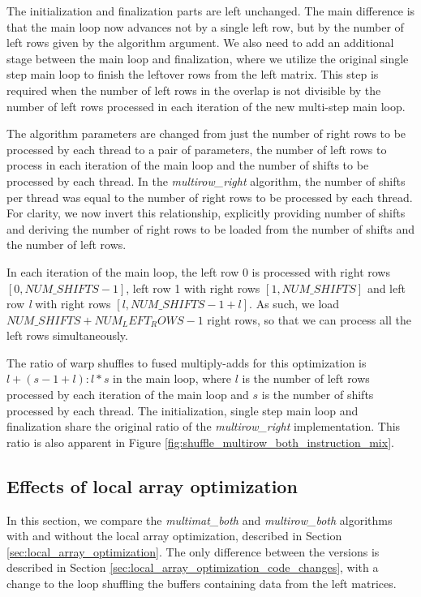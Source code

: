 The initialization and finalization parts are left unchanged. The main difference is that the main loop now advances not by a single left row, but by the number of left rows given by the algorithm argument. We also need to add an additional stage between the main loop and finalization, where we utilize the original single step main loop to finish the leftover rows from the left matrix. This step is required when the number of left rows in the overlap is not divisible by the number of left rows processed in each iteration of the new multi-step main loop.

The algorithm parameters are changed from just the number of right rows to be processed by each thread to a pair of parameters, the number of left rows to process in each iteration of the main loop and the number of shifts to be processed by each thread. In the \textit{multirow\_right} algorithm, the number of shifts per thread was equal to the number of right rows to be processed by each thread. For clarity, we now invert this relationship, explicitly providing number of shifts and deriving the number of right rows to be loaded from the number of shifts and the number of left rows. 

In each iteration of the main loop, the left row 0 is processed with right rows $[0, NUM\_SHIFTS - 1]$, left row 1 with right rows $[1, NUM\_SHIFTS]$ and left row \textit{l} with right rows $[l, NUM\_SHIFTS - 1 + l]$. As such, we load $NUM\_SHIFTS + NUM_LEFT_ROWS - 1$ right rows, so that we can process all the left rows simultaneously. 

The ratio of warp shuffles to fused multiply-adds for this optimization is $l + (s - 1 + l) : l * s$ in the main loop, where $l$ is the number of left rows processed by each iteration of the main loop and $s$ is the number of shifts processed by each thread.  
The initialization, single step main loop and finalization share the original ratio of the \textit{multirow\_right} implementation. This ratio is also apparent in Figure \ref{fig:shuffle_multirow_both_instruction_mix}.


\subsection{Effects of local array optimization}

In this section, we compare the \textit{multimat\_both} and \textit{multirow\_both} algorithms with and without the local array optimization, described in Section \ref{sec:local_array_optimization}. The only difference between the versions is described in Section \ref{sec:local_array_optimization_code_changes}, with a change to the loop shuffling the buffers containing data from the left matrices.

